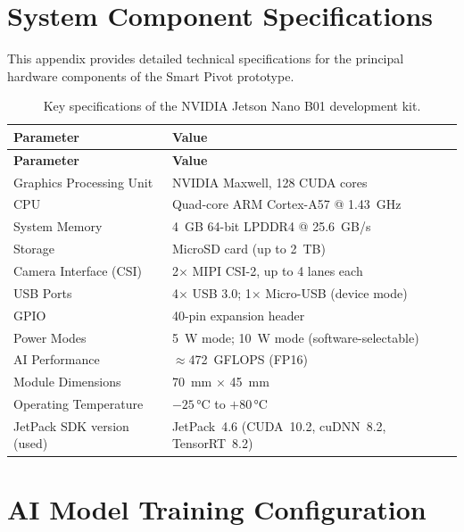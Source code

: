 \documentclass[12pt,a4paper]{report}
\renewcommand{\arraystretch}{1.3}
\begin{document}
\chapter{System Component Specifications}
\pagestyle{fancy}
\thispagestyle{empty}

This appendix provides detailed technical specifications for the principal hardware components of the Smart Pivot prototype.

\begingroup
\small
\setlength{\parskip}{0pt}
\setlength{\tabcolsep}{4pt}
\renewcommand{\arraystretch}{1.25}
\begin{longtable}{|P{0.38\textwidth}|P{0.52\textwidth}|}
\caption{Key specifications of the NVIDIA Jetson Nano B01 development kit.} \label{tab:jetsonnano_spec}\\
\hline
{}
\textbf{Parameter} & \textbf{Value} \\ \hline
\endfirsthead
\hline
{}
\textbf{Parameter} & \textbf{Value} \\ \hline
\endhead
Graphics Processing Unit & NVIDIA Maxwell, 128 CUDA cores \\ \hline
CPU & Quad-core ARM Cortex-A57 @ 1.43~GHz \\ \hline
System Memory & 4~GB 64-bit LPDDR4 @ 25.6~GB/s \\ \hline
Storage & MicroSD card (up to 2~TB) \\ \hline
Camera Interface (CSI) & 2$\times$ MIPI CSI-2, up to 4 lanes each \\ \hline
USB Ports & 4$\times$ USB 3.0; 1$\times$ Micro-USB (device mode) \\ \hline
GPIO & 40-pin expansion header \\ \hline
Power Modes & 5~W mode; 10~W mode (software-selectable) \\ \hline
AI Performance & $\approx$472~GFLOPS (FP16) \\ \hline
Module Dimensions & 70~mm $\times$ 45~mm \\ \hline
Operating Temperature & $-25$\,°C to $+80$\,°C \\ \hline
JetPack SDK version (used) & JetPack~4.6 (CUDA~10.2, cuDNN~8.2, TensorRT~8.2) \\ \hline
\end{longtable}
\endgroup

\chapter{AI Model Training Configuration}
\pagestyle{fancy}
\thispagestyle{empty}
\end{document}

